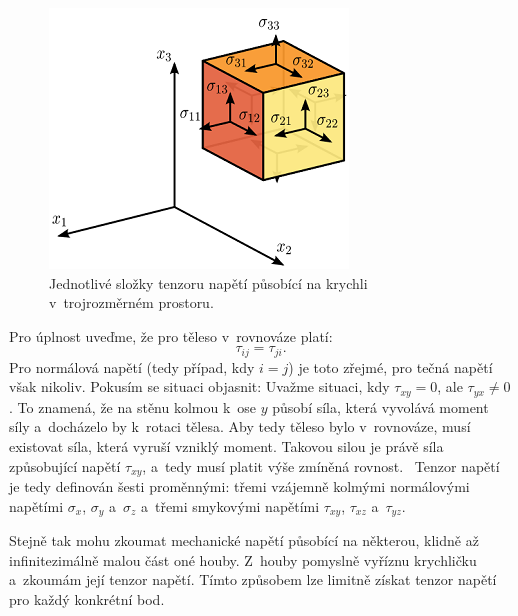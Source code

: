 \documentclass[12pt]{article}
\begin{document}
\begin{figure}
    \centering
    \includegraphics[width = 0.5\linewidth]{figures/Stress_vectors.png}
    \caption{Jednotlivé složky tenzoru napětí působící na krychli v~trojrozměrném prostoru.~\cite{Figure:stress_tensor}}
    \label{fig:tensor_napeti}
\end{figure}

\par \noindent
Pro úplnost uveďme, že pro těleso v~rovnováze platí:
\begin{equation}
    \tau_{ij} = \tau_{ji}.
    \label{eq:symmetry}
\end{equation}
Pro normálová napětí (tedy případ, kdy $i = j$) je toto zřejmé, pro tečná napětí však nikoliv. Pokusím se situaci objasnit: Uvažme situaci, kdy $\tau_{xy} = 0$, ale $\tau_{yx} \neq 0$. To znamená, že na stěnu kolmou k~ose $y$ působí síla, která vyvolává moment síly a~docházelo by k~rotaci tělesa. Aby tedy těleso bylo v~rovnováze, musí existovat síla, která vyruší vzniklý moment. Takovou silou je právě síla způsobující napětí $\tau_{xy}$, a~tedy musí platit výše zmíněná rovnost.\footnotemark~\cite{online:Skripta_napětí} Tenzor napětí je tedy definován šesti proměnnými: třemi vzájemně kolmými normálovými napětími $\sigma_x$, $\sigma_y$ a~$\sigma_z$ a~třemi smykovými napětími $\tau_{xy}$, $\tau_{xz}$ a~$\tau_{yz}$. \cite{wiki:Stress_mechanics}
\par\noindent
Stejně tak mohu zkoumat mechanické napětí působící na některou, klidně až infinitezimálně malou část oné houby. Z~houby pomyslně vyříznu krychličku a~zkoumám její tenzor napětí. Tímto způsobem lze limitně získat tenzor napětí pro každý konkrétní bod.~\cite{material:Mechanika_kontinua}~\cite{wiki:Cauchy_stress_tensor}
\end{document}
